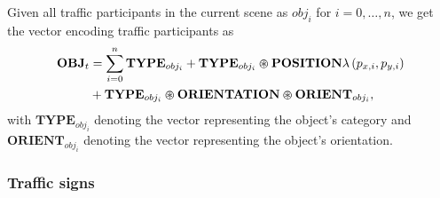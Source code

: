 Given all traffic participants in the current scene as $obj_{i}$ for $i=0, \ldots, n$, we get the vector encoding traffic participants as
\begin{align}
\label{eq:traffic_participants_context_class}
\mathbf{OBJ}_{t} &= \sum\limits_{i=0}^{n} \mathbf{TYPE}_{obj_i} + \mathbf{TYPE}_{obj_i} \varoast \mathbf{POSITION} \lambda\left(p_{x,i},p_{y,i}\right) \nonumber \\
                 &+ \mathbf{TYPE}_{obj_i}\varoast\mathbf{ORIENTATION}\varoast\mathbf{ORIENT}_{obj_i},
\end{align}
with $ \mathbf{TYPE}_{obj_i}$ denoting the vector representing the object's category and $ \mathbf{ORIENT}_{obj_i}$ denoting the vector representing the object's orientation.

\subsubsection{Traffic signs}%
\label{ssubsec:traffic_signs}

